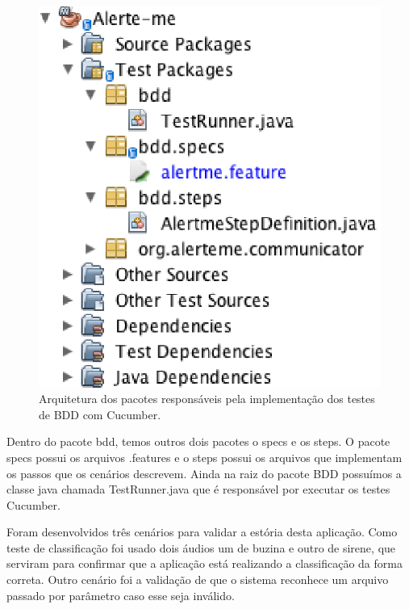 \begin{figure}[H]
	\centering
	\captionsetup{justification=centering,margin=2cm}
	\includegraphics[scale=0.65]{capitulos/validacao/figuras/arquiteturaDeBddComCucumber.eps}
	\caption{Arquitetura dos pacotes responsáveis pela implementação dos testes de BDD com Cucumber.}
	\label{fig:result-engajamento}
\end{figure}

Dentro do pacote bdd, temos outros dois pacotes o specs e os steps. O pacote specs possui os arquivos .features e o steps possui os arquivos que implementam os passos que os cenários descrevem. Ainda na raiz do pacote BDD possuímos a classe java chamada TestRunner.java que é responsável por executar os testes Cucumber.

Foram desenvolvidos três cenários para validar a estória desta aplicação. Como teste de classificação foi usado dois áudios um de buzina e outro de sirene, que serviram para confirmar que a aplicação está realizando a classificação da forma correta. Outro cenário foi a validação de que o sistema reconhece um arquivo passado por parâmetro caso esse seja inválido.


